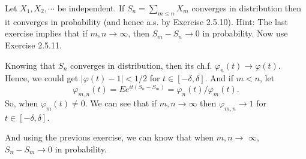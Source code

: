 \documentclass[en, normal, 12pt, black]{elegantnote}
\newenvironment{exercise}[1]{\begin{tcolorbox}[colback=black!15, colframe=black!80, breakable, title=#1]}{\end{tcolorbox}}
\newenvironment{solution}{\begin{tcolorbox}[colback=white, colframe=black!50, breakable, title=Solution. ]\setlength{\parskip}{0.8em}}{\end{tcolorbox}}
\begin{document}
\begin{exercise}{3.3.18}
    Let $X_{1}, X_{2}, \cdots$ be independent. If $S_{n}=\sum_{m \leqslant n} X_{m}$ converges in distribution then it converges in probability (and hence a.s. by Exercise 2.5.10). Hint: The last exercise implies that if $m, n \rightarrow \infty$, then $S_{m}-S_{n} \rightarrow 0$ in probability. Now use Exercise 2.5.11. 
\end{exercise}

\begin{solution}
    Knowing that $S_{n}$ converges in distribution, then its ch.f. $\varphi_{n}(t)\rightarrow \varphi(t)$. Hence, we could get $|\varphi(t)-1|<1 / 2$ for $t \in[-\delta, \delta]$. And if $m<n$, let
    \[
        \varphi_{m, n}(t)=E e^{i t\left(S_{n}-S_{m}\right)}=\varphi_{n}(t) / \varphi_{m}(t). 
    \]
    So, when $\varphi_{m}(t) \neq 0$. We can see that if $m, n \rightarrow \infty$ then $\varphi_{m, n} \rightarrow 1$ for $t \in[-\delta, \delta]$. 
    
    And using the previous exercise, we can know that when $m, n \rightarrow$ $\infty$, $S_{n}-S_{m} \rightarrow 0$ in probability. 
\end{solution}
\end{document}
